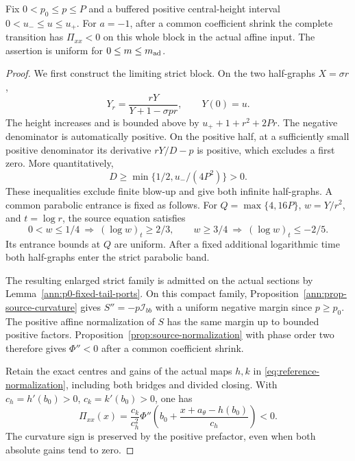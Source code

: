 \begin{lemma}
\label{ann:p0-middle-actual-curvature}
Fix \(0<p_0\le p\le P\) and a buffered positive central-height
interval \(0<u_-\le u\le u_+\). For \(a=-1\), after a common
coefficient shrink the complete transition has \(\Pi_{xx}<0\) on
this whole block in the actual affine input. The assertion is
uniform for \(0\le m\le m_{\rm ad}\).
\end{lemma}
\begin{proof}
We first construct the limiting strict block. On the two half-graphs
\(X=\sigma r\),
\[
 Y_r=\frac{rY}{Y+1-\sigma pr},\qquad Y(0)=u.
\]
The height increases and is bounded above by
\(u_++1+r^2+2Pr\). The negative denominator is automatically
positive. On the positive half, at a sufficiently small positive
denominator its derivative \(rY/D-p\) is positive, which excludes
a first zero. More quantitatively,
\[
 D\ge\min\{1/2,u_-/(4P^2)\}>0.
\]
These inequalities exclude finite blow-up and give both infinite
half-graphs. A common parabolic entrance is fixed as follows. For
\(Q=\max\{4,16P\}\), \(w=Y/r^2\), and \(t=\log r\), the source
equation satisfies
\[
 0<w\le1/4\ \Longrightarrow\ (\log w)_t\ge2/3,
 \qquad w\ge3/4\ \Longrightarrow\ (\log w)_t\le-2/5.
\]
Its entrance bounds at \(Q\) are uniform. After a fixed additional
logarithmic time both half-graphs enter the strict parabolic band.

The resulting enlarged strict family is admitted on the actual
sections by Lemma~\ref{ann:p0-fixed-tail-ports}. On this compact
family, Proposition~\ref{ann:prop-source-curvature} gives
\(S''=-p\mathcal I_{bb}\) with a uniform negative margin since
\(p\ge p_0\). The positive affine normalization of \(S\) has the
same margin up to bounded positive factors.
Proposition~\ref{prop:source-normalization} with phase order two
therefore gives \(\Phi''<0\) after a common coefficient shrink.

Retain the exact centres and gains of the actual maps \(h,k\) in
\eqref{eq:reference-normalization}, including both bridges and divided
closing. With \(c_h=h'(b_0)>0\), \(c_k=k'(b_0)>0\), one has
\begin{equation}\label{ann:p0-two-actual-adapters}
 \Pi_{xx}(x)=\frac{c_k}{c_h^2}\Phi''\!\left(
 b_0+\frac{x+a_\theta-h(b_0)}{c_h}\right)<0.
\end{equation}
The curvature sign is preserved by the positive prefactor, even when
both absolute gains tend to zero.
\end{proof}

